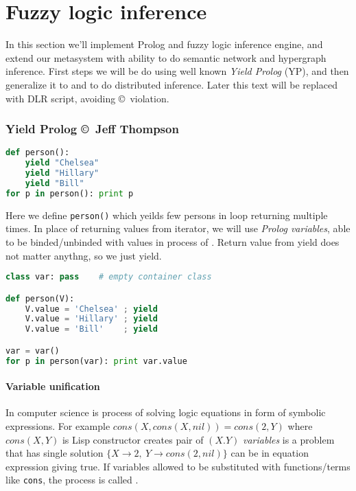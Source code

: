 \part{Fuzzy logic inference}

\noindent
In this section we'll implement Prolog and fuzzy logic inference engine, and
extend our metasystem with ability to do semantic network and hypergraph
inference.
First steps we will be do using well known \emph{Yield
Prolog} (YP), and then generalize it to  and
 to do distributed inference. Later this text will be
replaced with DLR script, avoiding \copyright\ violation.

\section{Yield Prolog \copyright\ Jeff Thompson}

\begin{lstlisting}[language=Python]
def person():
    yield "Chelsea"
    yield "Hillary"
    yield "Bill"
for p in person(): print p
\end{lstlisting}
Here we define \verb|person()|  which yeilds few
persons in loop returning  multiple times. In place of
returning values from iterator, we will use \emph{Prolog variables}, able to be
binded/unbinded with values in process of . Return value from
yield does not matter anythng, so we just yield.

\begin{lstlisting}[language=Python]
class var: pass    # empty container class

def person(V):
    V.value = 'Chelsea' ; yield
    V.value = 'Hillary' ; yield
    V.value = 'Bill'	; yield

var = var()
for p in person(var): print var.value
\end{lstlisting}

\subsection{Variable unification}

In computer science  is process of solving logic equations in
form of symbolic expressions. For example $cons(X,cons(X,nil)) = cons(2,Y)$
where $cons(X,Y)$ is Lisp constructor creates pair of $(X.Y)$ \emph{variables}
is a  problem that has single solution
$\{X\rightarrow 2,\ Y\rightarrow cons(2,nil)\}$ can be  in
equation expression giving true. If variables allowed to be substituted with
functions/terms like \verb|cons|, the process is called .

